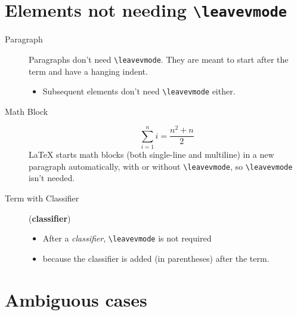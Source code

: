 \documentclass[a4paper]{article}
\begin{document}
\section{Elements not needing \texttt{\textbackslash{}leavevmode}}

\begin{description}
\item[{Paragraph}] 
Paragraphs don’t need \texttt{\textbackslash{}leavevmode}.  They are meant
to start after the term and have a hanging indent.

\begin{itemize}
\item Subsequent elements don’t need \texttt{\textbackslash{}leavevmode} either.
\end{itemize}

\item[{Math Block}] %
\begin{equation*}
\sum_{i=1}^n i = \frac{n^2+n}{2}
\end{equation*}
LaTeX starts math blocks (both single-line and multiline) in a new
paragraph automatically, with or without \texttt{\textbackslash{}leavevmode}, so
\texttt{\textbackslash{}leavevmode} isn’t needed.

\item[{Term with Classifier}] (\textbf{classifier})
\begin{itemize}
\item After a \emph{classifier}, \texttt{\textbackslash{}leavevmode} is not required

\item because the classifier is added (in parentheses) after the term.
\end{itemize}
\end{description}


\section{Ambiguous cases}
\end{document}
